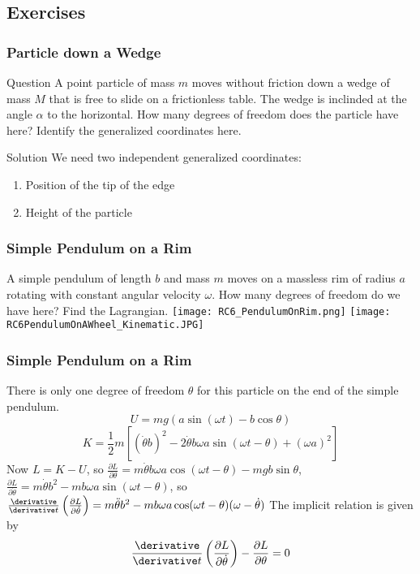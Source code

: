 \subsection{Exercises}
\begin{frame}
\frametitle{Particle down a Wedge}
\begin{block}{Question}
A point particle of mass $m$ moves without friction down a wedge of mass $M$ that is free to slide on a \alert{frictionless} table. The wedge is inclinded at the angle $\alpha$ to the horizontal. How many degrees of freedom does the particle have here? Identify the generalized coordinates here.
\end{block}
\begin{block}{Solution}
We need two independent generalized coordinates:\begin{enumerate}
\item Position of the tip of the edge
\item Height of the particle
\end{enumerate}
\end{block}
\end{frame}
\begin{frame}
\frametitle{Simple Pendulum on a Rim}
A simple pendulum of length $b$ and mass $m$ moves on a massless rim of radius $a$ rotating with constant angular velocity $\omega$. How many degrees of freedom do we have here? Find the Lagrangian.
\texttt{[image: RC6\_PendulumOnRim.png]}
\texttt{[image: RC6PendulumOnAWheel\_Kinematic.JPG]}
\end{frame}
\begin{frame}
\frametitle{Simple Pendulum on a Rim}
There is only one degree of freedom $\theta$ for this particle on the end of the simple pendulum. \[U=mg(a\sin(\omega t)-b\cos\theta)\] \[K=\frac{1}{2}m[(\dot\theta b)^2-2\dot\theta b\omega a\sin(\omega t-\theta)+(\omega a)^2]\]
Now $L=K-U$, so $\frac{\partial L}{\partial\theta}=m\dot\theta b\omega a\cos(\omega t-\theta)-mgb\sin\theta$, $\frac{\partial L}{\partial\dot\theta}=m\dot\theta b^2-mb\omega a\sin(\omega t-\theta)$, so $\frac{\derivative}{\derivative t}\left(\frac{\partial L}{\partial\dot\theta}\right)=m\ddot\theta b^2-mb\omega a\cos(\omega t-\theta)(\omega-\dot\theta)$ The implicit relation is given by
\[\frac{\derivative}{\derivative t}\left(\frac{\partial L}{\partial \dot\theta}\right)-\frac{\partial L}{\partial \theta}=0\]
\end{frame}
